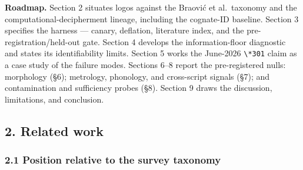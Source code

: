 \documentclass[
  10pt,
]{article}
\begin{document}
\textbf{Roadmap.} Section 2 situates logos against the Braović et
al.~taxonomy and the computational-decipherment lineage, including the
cognate-ID baseline. Section 3 specifies the harness --- canary,
deflation, literature index, and the pre-registration/held-out gate.
Section 4 develops the information-floor diagnostic and states its
identifiability limits. Section 5 works the June-2026
\texttt{\textbackslash{}*301} claim as a case study of the failure
modes. Sections 6--8 report the pre-registered nulls: morphology (§6);
metrology, phonology, and cross-script signals (§7); and contamination
and sufficiency probes (§8). Section 9 draws the discussion,
limitations, and conclusion.

\hypertarget{related-work}{%
\subsection{2. Related work}\label{related-work}}

\hypertarget{position-relative-to-the-survey-taxonomy}{%
\subsubsection{2.1 Position relative to the survey
taxonomy}\label{position-relative-to-the-survey-taxonomy}}
\end{document}
